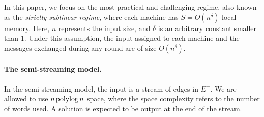 In this paper, we focus on the most practical and challenging regime, also known as the \emph{strictly sublinear regime}, where each machine has $S = O(n^\delta)$ local memory. Here, $n$ represents the input size, and $\delta$ is an arbitrary constant smaller than 1. Under this assumption, the input assigned to each machine and the messages exchanged during any round are of size $O(n^\delta)$.


\paragraph{The semi-streaming model.} In the semi-streaming model, the input is a stream of edges in \( E^{+} \). We are allowed to use \( n \operatorname{\text{{\rm polylog}}} n \) space, where the space complexity refers to the number of words used. A solution is expected to be output at the end of the stream.